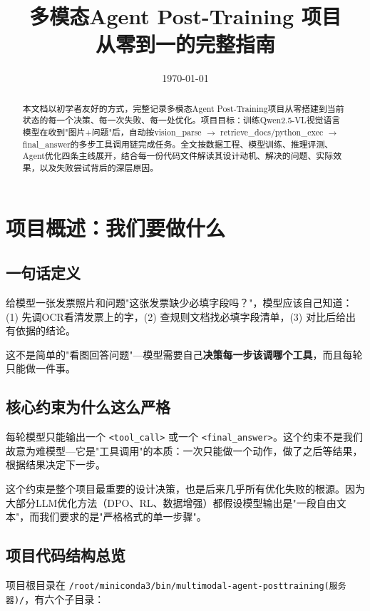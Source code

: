 \documentclass[fontset=none,11pt,a4paper]{ctexart}
\title{多模态Agent Post-Training 项目\\从零到一的完整指南}
\author{}
\date{\today}
\begin{document}
\maketitle

\begin{abstract}
本文档以初学者友好的方式，完整记录多模态Agent Post-Training项目从零搭建到当前状态的每一个决策、每一次失败、每一处优化。项目目标：训练Qwen2.5-VL视觉语言模型在收到"图片+问题"后，自动按vision\_parse $\to$ retrieve\_docs/python\_exec $\to$ final\_answer的多步工具调用链完成任务。全文按数据工程、模型训练、推理评测、Agent优化四条主线展开，结合每一份代码文件解读其设计动机、解决的问题、实际效果，以及失败尝试背后的深层原因。
\end{abstract}

\tableofcontents

\section{项目概述：我们要做什么}

\subsection{一句话定义}

给模型一张发票照片和问题"这张发票缺少必填字段吗？"，模型应该自己知道：(1) 先调OCR看清发票上的字，(2) 查规则文档找必填字段清单，(3) 对比后给出有依据的结论。

这不是简单的"看图回答问题"---模型需要自己\textbf{决策每一步该调哪个工具}，而且每轮只能做一件事。

\subsection{核心约束为什么这么严格}

每轮模型只能输出一个 \texttt{<tool\_call>} 或一个 \texttt{<final\_answer>}。这个约束不是我们故意为难模型---它是"工具调用"的本质：一次只能做一个动作，做了之后等结果，根据结果决定下一步。

这个约束是整个项目最重要的设计决策，也是后来几乎所有优化失败的根源。因为大部分LLM优化方法（DPO、RL、数据增强）都假设模型输出是"一段自由文本"，而我们要求的是"严格格式的单一步骤"。

\subsection{项目代码结构总览}

项目根目录在 \texttt{/root/miniconda3/bin/multimodal-agent-posttraining(服务器)/}，有六个子目录：
\end{document}

